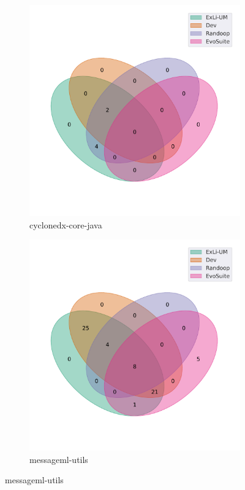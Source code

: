 \begin{figure}[t]\ContinuedFloat
\begin{subfigure}[b]{0.45\textwidth}
\includegraphics[width=\textwidth]{figures/venn/CycloneDX_cyclonedx-core-java-venn.pdf}
\vspace{-10pt}
\caption{cyclonedx-core-java}
\label{fig:venn-CycloneDX_cyclonedx-core-java}
\end{subfigure}
\hfill
\begin{subfigure}[b]{0.45\textwidth}
\includegraphics[width=\textwidth]{figures/venn/finos_messageml-utils-venn.pdf}
\vspace{-10pt}
\caption{messageml-utils}
\label{fig:venn-finos_messageml-utils}
\end{subfigure}
\end{figure}
